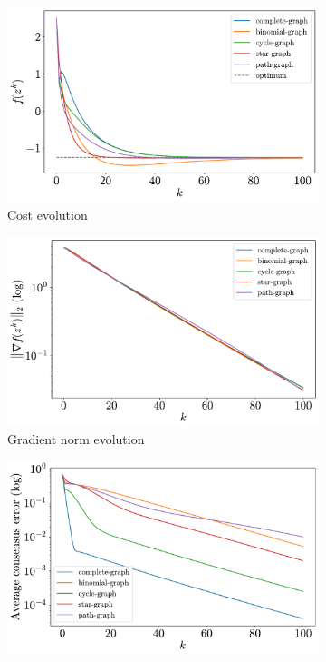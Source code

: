 \documentclass[a4paper,11pt,oneside]{book}
\begin{document}
\begin{figure}[H]
      \centering
      \begin{subfigure}[t]{0.49\textwidth}
            \centering
            \includegraphics[width=\linewidth]{./figs/quadratic/cost_5_3_100.pdf} 
            \caption{Cost evolution}
      \end{subfigure}
      \hfill
      \begin{subfigure}[t]{0.49\textwidth}
            \centering
            \includegraphics[width=\linewidth]{./figs/quadratic/gradient_5_3_100.pdf} 
            \caption{Gradient norm evolution}
      \end{subfigure}
      \hfill
      \begin{subfigure}[t]{0.49\textwidth}
            \centering
            \includegraphics[width=\linewidth]{./figs/quadratic/consensus_5_3_100.pdf} 

\end{subfigure}
\end{figure}
\end{document}
